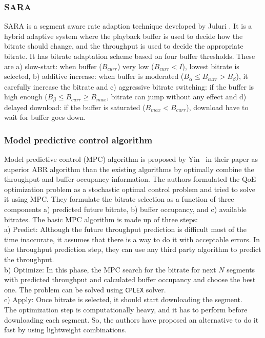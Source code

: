 \subsubsection{SARA}
SARA\cite{7247436} is a segment aware rate adaption technique developed by Juluri \etal. It is a hybrid adaptive system where the playback buffer is used to decide how the bitrate should change, and the throughput is used to decide the appropriate bitrate. It has bitrate adaptation scheme based on four buffer thresholds. These are a) slow-start: when buffer ($B_{curr}$) very low ($B_{curr}<I$), lowest bitrate is selected, b) additive increase: when buffer is moderated ($B_{\alpha} \le B_{curr} > B_{\beta}$), it carefully increase the bitrate and c) aggressive bitrate switching: if the buffer is high enough ($B_{\beta} \le B_{curr} \ge B_{max}$, bitrate can jump without any effect and d) delayed download: if the buffer is saturated ($B_{max} < B_{curr}$), download have to wait for buffer goes down.

\subsubsection{Model predictive control algorithm}
Model predictive control (MPC) algorithm is proposed by Yin \etal\ in their paper \cite{yin2015control,10.1145/2670518.2673877} as superior ABR algorithm than the existing algorithms by optimally combine the throughput and buffer occupancy information. The authors formulated the QoE optimization problem as a stochastic optimal control problem and tried to solve it using MPC. They formulate the bitrate selection as a function of three components a) predicted future bitrate, b) buffer occupancy, and c) available bitrates. The basic MPC algorithm is made up of three steps: \\
a) Predict: Although the future throughput prediction is difficult most of the time inaccurate, it assumes that there is a way to do it with acceptable errors. In the throughput prediction step, they can use any third party algorithm to predict the throughput.\\
b) Optimize: In this phase, the MPC search for the bitrate for next $N$ segments with predicted throughput and calculated buffer occupancy and choose the best one. The problem can be solved using {\tt CPLEX} solver.\\
c) Apply: Once bitrate is selected, it should start downloading the segment.\\
The optimization step is computationally heavy, and it has to perform before downloading each segment. So, the authors have proposed an alternative to do it fast by using lightweight combinations.


